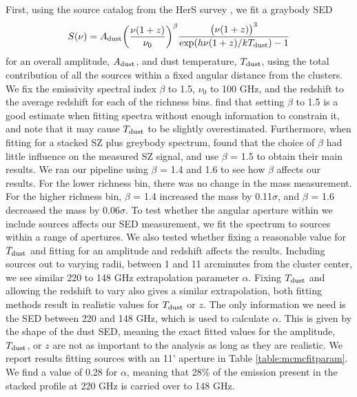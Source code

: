 \documentclass[a4paper,fleqn,usenatbib]{mnras}
\begin{document}
First, using the source catalog from the HerS survey \citep{2014ApJS..210...22V}, we fit a graybody SED 
\begin{equation}
  \label{eq:dustSED}
  \centering
  S(\nu) = A_{\rm dust}  \bigg(\frac{\nu(1+z)}{\nu_0}\bigg)^{\beta} \frac{\big(\nu(1+z)\big)^{3} }{{\exp({h \nu (1+z) / k T_{\rm dust}}) - 1}}
\end{equation}
for an overall amplitude, $A_{\rm dust}$, and dust temperature, $T_{\rm dust}$, using the total contribution of all the sources within a fixed angular distance from the clusters. We fix the emissivity spectral index $\beta$ to 1.5, $\nu_0$ to 100 GHz, and the redshift to the average redshift for each of the richness bins. \cite{2014A&A...561A..86M} find that setting $\beta$ to 1.5 is a good estimate when fitting spectra without enough information to constrain it, and note that it may cause $T_{\rm dust}$ to be slightly overestimated. Furthermore, when fitting for a stacked SZ plus greybody spectrum, \cite{2017arXiv170901187E} found that the choice of $\beta$ had little influence on the measured SZ signal, and use $\beta$ = 1.5 to obtain their main results. We ran our pipeline using $\beta$ = 1.4 and 1.6 to see how $\beta$ affects our results. For the lower richness bin, there was no change in the mass measurement. For the higher richness bin, $\beta$ = 1.4 increased the mass by 0.11$\sigma$, and $\beta$ = 1.6 decreased the mass by 0.06$\sigma$. To test whether the angular aperture within we include sources affects our SED measurement, we fit the spectrum to sources within a range of apertures.  We also tested whether fixing a reasonable value for $T_{\rm dust}$ and fitting for an amplitude and redshift affects the results. Including sources out to varying radii, between 1 and 11 arcminutes from the cluster center, we see similar 220 to 148 GHz extrapolation parameter $\alpha$. Fixing $T_{\rm dust}$ and allowing the redshift to vary also gives a similar extrapolation, both fitting methods result in realistic values for $T_{\rm dust}$ or $z$. The only information we need is the SED between 220 and 148 GHz, which is used to calculate $\alpha$. This is given by the shape of the dust SED, meaning the exact fitted values for the amplitude, $T_{\rm dust}$, or $z$ are not as important to the analysis as long as they are realistic. 
We report results fitting sources with an 11' aperture in Table \ref{table:mcmcfitparam}. We find a value of 0.28 for $\alpha$, meaning that 28\% of the emission present in the stacked profile at 220 GHz is carried over to 148 GHz.
\end{document}
